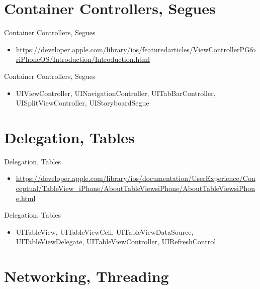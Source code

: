 \documentclass{beamer}
\begin{document}
\section{Container Controllers, Segues}

\begin{frame}{Container Controllers, Segues}
    \begin{itemize}
    \item {
        \url { https://developer.apple.com/library/ios/featuredarticles/ViewControllerPGforiPhoneOS/Introduction/Introduction.html }
    }
    \end{itemize}
\end{frame}

\begin{frame}{Container Controllers, Segues}
    \begin{itemize}
    \item {
        UIViewController, UINavigationController, UITabBarController, UISplitViewController, UIStoryboardSegue
    }
    \end{itemize}
\end{frame}

\section{Delegation, Tables}

\begin{frame}{Delegation, Tables}
    \begin{itemize}
    \item {
        \url {https://developer.apple.com/library/ios/documentation/UserExperience/Conceptual/TableView_iPhone/AboutTableViewsiPhone/AboutTableViewsiPhone.html}
    }
    \end{itemize}
\end{frame}

\begin{frame}{Delegation, Tables}
    \begin{itemize}
    \item {
        UITableView, UITableViewCell, UITableViewDataSource, UITableViewDelegate, UITableViewController, UIRefreshControl
    }
    \end{itemize}
\end{frame}

\section{Networking, Threading}
\end{document}
